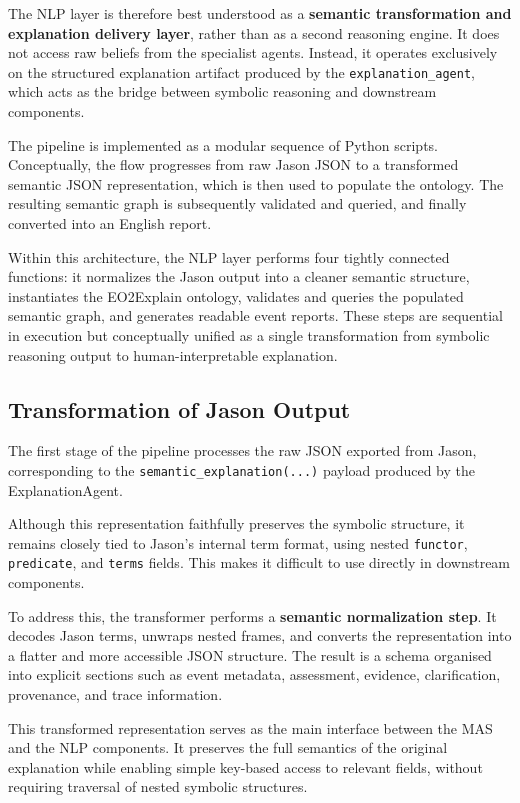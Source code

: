 \documentclass[12pt]{article}
\let\oldtexttt\texttt
\renewcommand{\texttt}[1]{{\fontsize{10.5}{12}\selectfont\oldtexttt{#1}}}
\begin{document}
The NLP layer is therefore best understood as a \textbf{semantic transformation and explanation delivery layer}, rather than as a second reasoning engine. It does not access raw beliefs from the specialist agents. Instead, it operates exclusively on the structured explanation artifact produced by the \texttt{explanation\_agent}, which acts as the bridge between symbolic reasoning and downstream components.

The pipeline is implemented as a modular sequence of Python scripts. Conceptually, the flow progresses from raw Jason JSON to a transformed semantic JSON representation, which is then used to populate the ontology. The resulting semantic graph is subsequently validated and queried, and finally converted into an English report.

Within this architecture, the NLP layer performs four tightly connected functions: it normalizes the Jason output into a cleaner semantic structure, instantiates the EO2Explain ontology, validates and queries the populated semantic graph, and generates readable event reports. These steps are sequential in execution but conceptually unified as a single transformation from symbolic reasoning output to human-interpretable explanation.

\subsection{Transformation of Jason Output}

The first stage of the pipeline processes the raw JSON exported from Jason, corresponding to the \texttt{semantic\_explanation(...)} payload produced by the ExplanationAgent.

Although this representation faithfully preserves the symbolic structure, it remains closely tied to Jason’s internal term format, using nested \texttt{functor}, \texttt{predicate}, and \texttt{terms} fields. This makes it difficult to use directly in downstream components.

To address this, the transformer performs a \textbf{semantic normalization step}. It decodes Jason terms, unwraps nested frames, and converts the representation into a flatter and more accessible JSON structure. The result is a schema organised into explicit sections such as event metadata, assessment, evidence, clarification, provenance, and trace information.

This transformed representation serves as the main interface between the MAS and the NLP components. It preserves the full semantics of the original explanation while enabling simple key-based access to relevant fields, without requiring traversal of nested symbolic structures.
\end{document}
